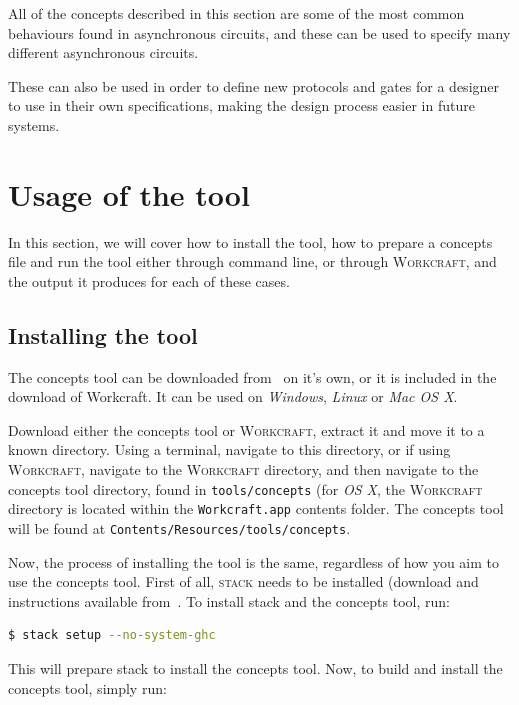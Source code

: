 \documentclass[british,conference,compsoc]{IEEEtran}
\newcommand{\noun}[1]{\textsc{#1}}
\begin{document}
\noindent All of the concepts described in this section are some of the most
common behaviours found in asynchronous circuits, and these can be used
to specify many different asynchronous circuits. 

These can also be used in order to define new protocols and gates for a designer
to use in their own specifications, making the design process easier in future 
systems. 

\section{Usage of the tool\label{sec:tool-use}}

In this section, we will cover how to install the tool, how to prepare a
concepts file and  run the tool either through command line, or through 
\noun{Workcraft}, and the output it produces for each of these cases.

\subsection{Installing the tool \label{sub:installing}}

The concepts tool can be downloaded from~\cite{2016_concepts_github} on it's
own, or it is included in the download of Workcraft. It can be used on 
\emph{Windows}, \emph{Linux} or \emph{Mac OS X}.

Download either the concepts tool or \noun{Workcraft}, extract it and move it to
a known directory. Using a terminal, navigate to this directory,
or if using \noun{Workcraft}, navigate to the \noun{Workcraft} directory, and
then navigate to the concepts tool directory, found in \texttt{tools/concepts} 
(for \emph{OS X}, the \noun{Workcraft} directory is located within the 
\texttt{Workcraft.app} contents folder. The concepts tool will be found at 
\texttt{Contents/Resources/tools/concepts}.

Now, the process of installing the tool is the same, regardless of how you aim 
to use the concepts tool. First of all,  \noun{stack} needs to be installed 
(download and instructions available from~\cite{stack_website}. 
To install stack and the concepts tool, run: 

\begin{lstlisting}[language=bash]
  $ stack setup --no-system-ghc
\end{lstlisting}

This will prepare stack to install the concepts tool. Now, to build and install
the concepts tool, simply run:
\end{document}
